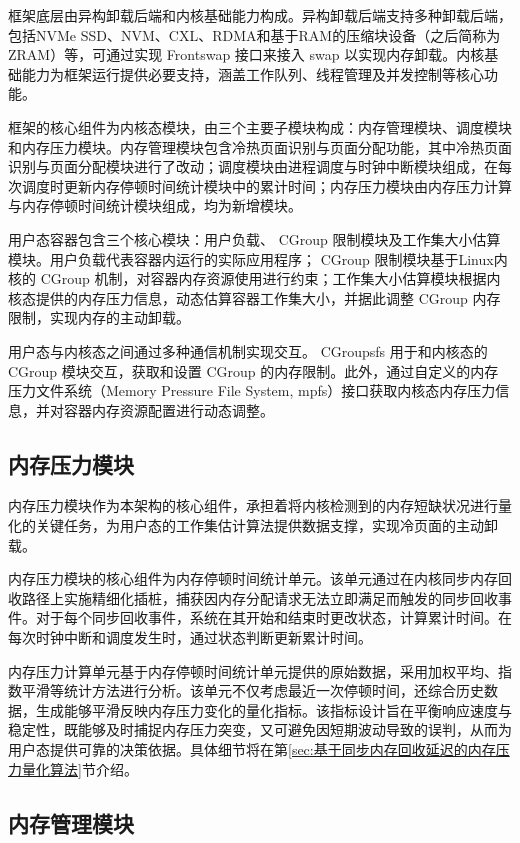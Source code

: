 框架底层由异构卸载后端和内核基础能力构成。异构卸载后端支持多种卸载后端，包括NVMe SSD、NVM、CXL、RDMA和基于RAM的压缩块设备（之后简称为ZRAM）等，可通过实现 Frontswap 接口来接入 swap 以实现内存卸载。内核基础能力为框架运行提供必要支持，涵盖工作队列、线程管理及并发控制等核心功能。

框架的核心组件为内核态模块，由三个主要子模块构成：内存管理模块、调度模块和内存压力模块。内存管理模块包含冷热页面识别与页面分配功能，其中冷热页面识别与页面分配模块进行了改动；调度模块由进程调度与时钟中断模块组成，在每次调度时更新内存停顿时间统计模块中的累计时间；内存压力模块由内存压力计算与内存停顿时间统计模块组成，均为新增模块。

用户态容器包含三个核心模块：用户负载、 CGroup 限制模块及工作集大小估算模块。用户负载代表容器内运行的实际应用程序； CGroup 限制模块基于Linux内核的 CGroup 机制，对容器内存资源使用进行约束；工作集大小估算模块根据内核态提供的内存压力信息，动态估算容器工作集大小，并据此调整 CGroup 内存限制，实现内存的主动卸载。

用户态与内核态之间通过多种通信机制实现交互。 CGroupsfs 用于和内核态的 CGroup 模块交互，获取和设置 CGroup 的内存限制。此外，通过自定义的内存压力文件系统（Memory Pressure File System, mpfs）接口获取内核态内存压力信息，并对容器内存资源配置进行动态调整。

\subsection{内存压力模块}

内存压力模块作为本架构的核心组件，承担着将内核检测到的内存短缺状况进行量化的关键任务，为用户态的工作集估计算法提供数据支撑，实现冷页面的主动卸载。

内存压力模块的核心组件为内存停顿时间统计单元。该单元通过在内核同步内存回收路径上实施精细化插桩，捕获因内存分配请求无法立即满足而触发的同步回收事件。对于每个同步回收事件，系统在其开始和结束时更改状态，计算累计时间。在每次时钟中断和调度发生时，通过状态判断更新累计时间。

内存压力计算单元基于内存停顿时间统计单元提供的原始数据，采用加权平均、指数平滑等统计方法进行分析。该单元不仅考虑最近一次停顿时间，还综合历史数据，生成能够平滑反映内存压力变化的量化指标。该指标设计旨在平衡响应速度与稳定性，既能够及时捕捉内存压力突变，又可避免因短期波动导致的误判，从而为用户态提供可靠的决策依据。具体细节将在第\ref{sec:基于同步内存回收延迟的内存压力量化算法}节介绍。


\subsection{内存管理模块}

